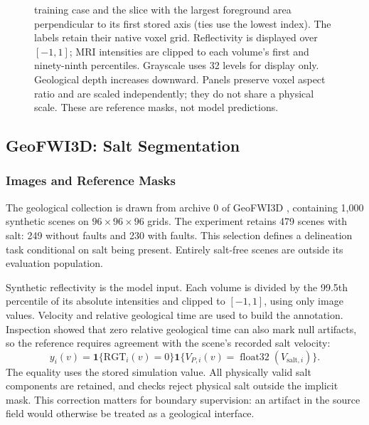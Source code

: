 \documentclass[12pt,a4paper]{article}
\begin{document}
\begin{figure}[p]
{training case and the slice with the largest foreground area perpendicular
to its first stored axis (ties use the lowest index). The labels retain
their native voxel grid. Reflectivity is displayed over $[-1,1]$; MRI
intensities are clipped to each volume's first and ninety-ninth percentiles.
Grayscale uses 32 levels for display only. Geological depth increases
downward. Panels preserve voxel aspect ratio and are scaled independently;
they do not share a physical scale. These are reference masks, not model
predictions.}
\label{fig:dataset-examples}
\end{figure}

\FloatBarrier
\subsection{GeoFWI3D: Salt Segmentation}
\label{sec:geo-methods}

\subsubsection{Images and Reference Masks}

The geological collection is drawn from archive 0 of GeoFWI3D
\cite{swaminadhan2026geofwi3d}, containing 1,000 synthetic scenes on
$96\times96\times96$ grids. The experiment retains 479 scenes with
salt: 249 without faults and 230 with faults. This selection defines
a delineation task conditional on salt being present. Entirely
salt-free scenes are outside its evaluation population.

Synthetic reflectivity is the model input. Each volume is divided by
the 99.5th percentile of its absolute intensities and clipped to
$[-1,1]$, using only image values. Velocity and relative geological
time are used to build the annotation. Inspection showed that zero
relative geological time can also mark null artifacts, so the reference
requires agreement with the scene's recorded salt velocity:
\begin{equation}
 y_i(v)=\mathbf{1}\{\mathrm{RGT}_i(v)=0\}
        \mathbf{1}\{V_{P,i}(v)=\operatorname{float32}(V_{\mathrm{salt},i})\}.
\label{eq:geo-reference-construction}
\end{equation}
The equality uses the stored simulation value. All physically valid
salt components are retained, and checks reject physical salt outside
the implicit mask. This correction matters for boundary supervision:
an artifact in the source field would otherwise be treated as a
geological interface.
\end{document}
